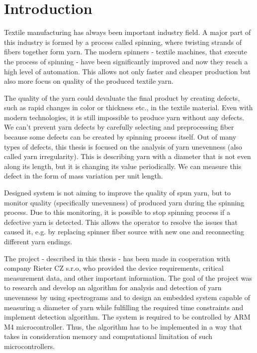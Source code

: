 \documentclass[twoside]{ctuthesis}
\theoremstyle{plain}
\theoremstyle{definition}
\theoremstyle{note}
\begin{document}
	
\maketitle

\chapter{Introduction}
Textile manufacturing has always been important industry field. A major part of this industry is formed by a process called spinning, where twisting strands of fibers together form yarn. The modern spinners - textile machines, that execute the process of spinning - have been significantly improved and now they reach a high level of automation. This allows not only faster and cheaper production but also more focus on quality of the produced textile yarn. 

The quality of the yarn could devaluate the final product by creating defects, such as rapid changes in color or thickness etc., in the textile material. Even with modern technologies, it is still impossible to produce yarn without any defects. We can't prevent yarn defects by carefully selecting and preprocessing fiber because some defects can be created by spinning process itself. Out of many types of defects, this thesis is focused on the analysis of yarn unevenness (also called yarn irregularity). This is describing yarn with a diameter that is not even along its length, but it is changing its value periodically. We can measure this defect in the form of mass variation per unit length.

Designed system is not aiming to improve the quality of spun yarn, but to monitor quality (specifically unevenness) of produced yarn during the spinning process. Due to this monitoring, it is possible to stop spinning process if a defective yarn is detected. This allows the operator to resolve the issues that caused it, e.g. by replacing spinner fiber source with new one and reconnecting different yarn endings.

The project - described in this thesis - has been made in cooperation with company Rieter CZ s.r.o, who provided the device requirements, critical measurement data, and other important information. The goal of the project was to research and develop an algorithm for analysis and detection of yarn unevenness by using spectrograms and to design an embedded system capable of measuring a diameter of yarn while fulfilling the required time constraints and implement detection algorithm. The system is required to be controlled by ARM M4 microcontroller. Thus, the algorithm has to be implemented in a way that takes in consideration memory and computational limitation of such microcontrollers.
\end{document}
